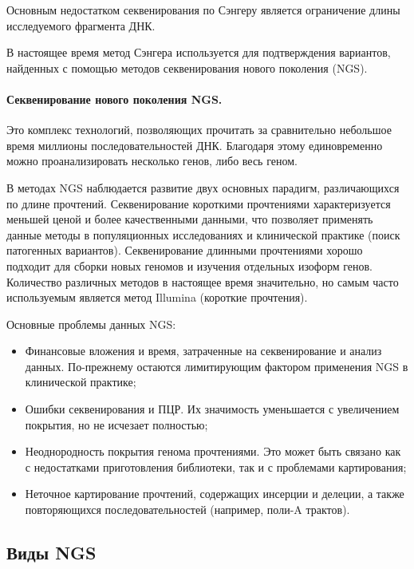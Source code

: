 \documentclass[a4paper,12pt]{article}
\begin{document}
Основным недостатком секвенирования по Сэнгеру является ограничение длины исследуемого фрагмента ДНК.

В настоящее время метод Сэнгера используется для подтверждения вариантов, найденных с помощью методов секвенирования нового поколения (NGS).

\paragraph{Секвенирование нового поколения NGS.}
Это комплекс технологий, позволяющих прочитать за сравнительно небольшое время миллионы последовательностей ДНК.
Благодаря этому единовременно можно проанализировать несколько генов, либо весь геном.

В методах NGS наблюдается развитие двух основных парадигм, различающихся по длине прочтений.
Секвенирование короткими прочтениями характеризуется меньшей ценой и более качественными данными, что позволяет применять данные методы в популяционных исследованиях и клинической практике (поиск патогенных вариантов).
Секвенирование длинными прочтениями хорошо подходит для сборки новых геномов и изучения отдельных изоформ генов\cite{Goodwin_2016}.
Количество различных методов в настоящее время значительно, но самым часто используемым является метод Illumina (короткие прочтения).

Основные проблемы данных NGS:

\begin{itemize}
\item Финансовые вложения и время, затраченные на секвенирование и анализ данных.
По-прежнему остаются лимитирующим фактором применения NGS в клинической практике;
\item Ошибки секвенирования и ПЦР.
Их значимость уменьшается с увеличением покрытия, но не исчезает полностью;
\item Неоднородность покрытия генома прочтениями.
Это может быть связано как с недостатками приготовления библиотеки, так и с проблемами картирования;
\item Неточное картирование прочтений, содержащих инсерции и делеции, а также повторяющихся последовательностей (например, поли-A трактов).
\end{itemize}

\subsection{Виды NGS}
\end{document}
